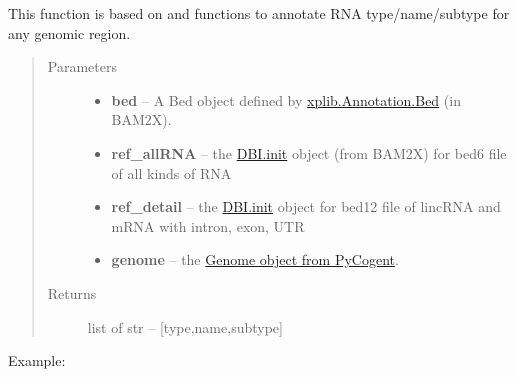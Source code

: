 \documentclass[letterpaper,10pt,english]{sphinxmanual}
\begin{document}

\begin{fulllineitems}
\label{Other_api:Annotation.annotation}
This function is based on {\hyperref[Other_api:Annotation.overlap]{}} and {\hyperref[Other_api:Annotation.Subtype]{}} functions to annotate RNA type/name/subtype for any genomic region.
\begin{quote}\begin{description}
\item[{Parameters}] \leavevmode\begin{itemize}
\item {} 
\textbf{bed} -- 
A Bed object defined by \href{http://bam2xwiki.appspot.com/bed}{xplib.Annotation.Bed} (in BAM2X).


\item {} 
\textbf{ref\_allRNA} -- the \href{http://bam2xwiki.appspot.com/DBI}{DBI.init} object (from BAM2X) for bed6 file of all kinds of RNA

\item {} 
\textbf{ref\_detail} -- 
the \href{http://bam2xwiki.appspot.com/DBI}{DBI.init} object for bed12 file of lincRNA and mRNA with intron, exon, UTR


\item {} 
\textbf{genome} -- the \href{http://pycogent.org/cookbook/accessing\_databases.html\#get-genomic-features}{Genome object from PyCogent}.

\end{itemize}

\item[{Returns}] \leavevmode
list of str -- {[}type,name,subtype{]}

\end{description}\end{quote}

Example:


\end{fulllineitems}
\end{document}
